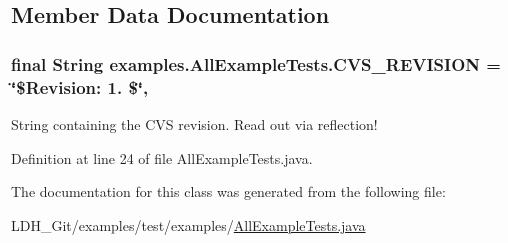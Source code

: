 \subsection{Member Data Documentation}
\hypertarget{classexamples_1_1_all_example_tests_ae472bfe4c4533cccf96e0f5698b7c64a}{
\subsubsection[{C\-V\-S\-\_\-\-R\-E\-V\-I\-S\-I\-O\-N}]{\setlength{\rightskip}{0pt plus 5cm}final String examples.\-All\-Example\-Tests.\-C\-V\-S\-\_\-\-R\-E\-V\-I\-S\-I\-O\-N = \char`\"{}\$Revision\-: 1. \$\char`\"{}\hspace{0.3cm}{\ttfamily [static]}, {\ttfamily [private]}}}\label{classexamples_1_1_all_example_tests_ae472bfe4c4533cccf96e0f5698b7c64a}
String containing the C\-V\-S revision. Read out via reflection! 

Definition at line 24 of file All\-Example\-Tests.\-java.



The documentation for this class was generated from the following file\-:\begin{DoxyCompactItemize}
\item 
L\-D\-H\-\_\-\-Git/examples/test/examples/\hyperlink{_all_example_tests_8java}{All\-Example\-Tests.\-java}\end{DoxyCompactItemize}
